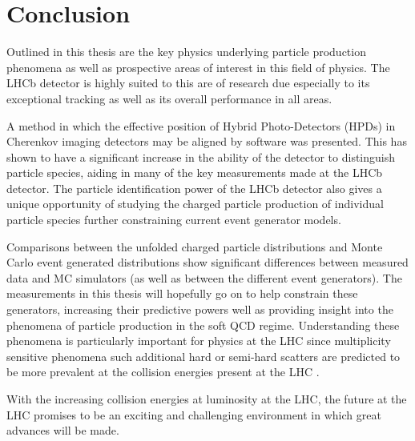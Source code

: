 \chapter{Conclusion}

Outlined in this thesis are the key physics underlying particle production phenomena as well as prospective areas of interest in this field of physics. The LHCb detector is highly suited to this are of research due especially to its exceptional tracking as well as its overall performance in all areas. 

A method in which the effective position of Hybrid Photo-Detectors (HPDs) in Cherenkov imaging detectors may be aligned by software was presented. This has shown to have a significant increase in the ability of the detector to distinguish particle species, aiding in many of the key measurements made at the LHCb detector. The particle identification power of the LHCb detector also gives a unique opportunity of studying the charged particle production of individual particle species further constraining current event generator models.

Comparisons between the unfolded charged particle distributions and Monte Carlo event generated distributions show significant differences between measured data and MC simulators (as well as between the different event generators). The measurements in this thesis will hopefully go on to help constrain these generators, increasing their predictive powers well as providing insight into the phenomena of particle production in the soft QCD regime. Understanding these phenomena is particularly important for physics at the LHC since multiplicity sensitive phenomena such additional hard or semi-hard scatters are predicted to be more prevalent at the collision energies present at the LHC \cite{arXiv:1111.0469}.

With the increasing collision energies at luminosity at the LHC, the future at the LHC promises to be an exciting and challenging environment in which great advances will be made.